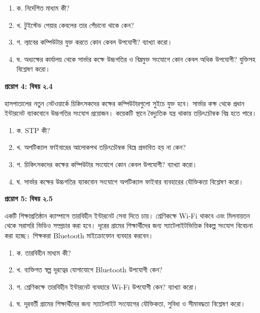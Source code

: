 \begin{enumerate}
\item ক. নির্দেশিত মাধ্যম কী?
\item খ. টুইস্টেড পেয়ার কেবলের তার পেঁচানো থাকে কেন?
\item গ. ল্যাবের কম্পিউটার যুক্ত করতে কোন কেবল উপযোগী? ব্যাখ্যা করো।
\item ঘ. অধ্যক্ষের কার্যালয় থেকে সার্ভার কক্ষে উচ্চগতির ও বিঘ্নমুক্ত সংযোগে কোন কেবল অধিক উপযোগী? যুক্তিসহ বিশ্লেষণ করো।
\end{enumerate}
\par

\par{}
\textbf{প্রয়োগ 4: বিষয় ২.4}\par
হাসপাতালের নতুন নেটওয়ার্কে চিকিৎসকদের কক্ষের কম্পিউটারগুলো সুইচে যুক্ত হবে। সার্ভার কক্ষ থেকে প্রধান ইন্টারনেট ব্যাকবোনে উচ্চগতির সংযোগ প্রয়োজন। কয়েকটি স্থানে বৈদ্যুতিক যন্ত্র থাকায় তড়িৎচৌম্বক বিঘ্ন হতে পারে।

\begin{enumerate}
\item ক. STP কী?
\item খ. অপটিক্যাল ফাইবারের আলোকপথ তড়িৎচৌম্বক বিঘ্নে প্রভাবিত হয় না কেন?
\item গ. চিকিৎসকদের কক্ষের কম্পিউটার সংযোগে কোন কেবল উপযোগী? ব্যাখ্যা করো।
\item ঘ. সার্ভার কক্ষের উচ্চগতির ব্যাকবোন সংযোগে অপটিক্যাল ফাইবার ব্যবহারের যৌক্তিকতা বিশ্লেষণ করো।
\end{enumerate}
\par

\par{}
\textbf{প্রয়োগ 5: বিষয় ২.5}\par
\par
একটি শিক্ষাপ্রতিষ্ঠান ক্যাম্পাসে তারবিহীন ইন্টারনেট সেবা দিতে চায়। শ্রেণিকক্ষে Wi-Fi থাকবে এবং মিলনায়তন থেকে সরাসরি ভিডিও সম্প্রচার করা হবে। দূরের গ্রামের শিক্ষার্থীদের জন্য স্যাটেলাইটভিত্তিক বিকল্প সংযোগ বিবেচনা করা হচ্ছে। শিক্ষকরা Bluetooth মাইক্রোফোন ব্যবহার করবেন।

\begin{enumerate}
\item ক. তারবিহীন মাধ্যম কী?
\item খ. ব্যক্তিগত স্বল্প দূরত্বের যোগাযোগে Bluetooth উপযোগী কেন?
\item গ. শ্রেণিকক্ষে তারবিহীন ইন্টারনেট ব্যবহারে Wi-Fi উপযোগী কেন? ব্যাখ্যা করো।
\item ঘ. দূরবর্তী গ্রামের শিক্ষার্থীদের জন্য স্যাটেলাইট সংযোগের যৌক্তিকতা, সুবিধা ও সীমাবদ্ধতা বিশ্লেষণ করো।
\end{enumerate}
\par

